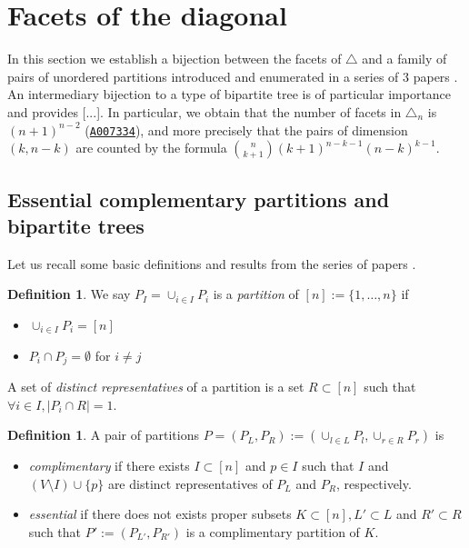 \documentclass[11pt]{amsart}
\theoremstyle{definition}
\newtheorem{definition}[thm]{Definition}
\theoremstyle{remark}
\numberwithin{equation}{section}
\newcommand{\0}{\color{blue}{\mathsf{0}}}
\newcommand{\OEIS}[1]{{\rm \href{http://oeis.org/#1}{\texttt{#1}}}}
\begin{document}
\section{Facets of the diagonal}

In this section we establish a bijection between the facets of $\triangle$ and a family of pairs of unordered partitions introduced and enumerated in a series of 3 papers \cite{chen1969computer,chen1971tables,kajitani1982number}. An intermediary bijection to a type of bipartite tree is of particular importance and provides [...].
In particular, we obtain that the number of facets in $\triangle_n$ is $(n+1)^{n-2}$ (\OEIS{A007334}), and more precisely that the pairs of dimension $(k,n-k)$ are counted by the formula $\binom{n}{k+1}(k+1)^{n-k-1}(n-k)^{k-1}$.

\subsection{Essential complementary partitions and bipartite trees}
Let us recall some basic definitions and results from the series of papers \cite{chen1969computer,chen1971tables,kajitani1982number}.

\begin{definition}
We say $P_I = \cup_{i\in I} P_i$ is a \emph{partition} of $[n]:=\{1,\ldots,n\}$ if
\begin{itemize}
    \item $ \cup_{i\in I} P_i = [n]$
    \item $P_i \cap P_j = \emptyset$ for $i \neq j$
\end{itemize}
A set of \emph{distinct representatives} of a partition is a set $R\subset [n]$ such that $\forall i \in I,|P_i \cap R| = 1$.
\end{definition}



\begin{definition}
A pair of partitions $P=(P_L,P_R):=(\cup_{l\in L} P_l , \cup_{r\in R} P_r)$ is
\begin{itemize}
    \item \emph{complimentary} if there exists $I\subset [n]$ and $p \in I$ such that $I$ and $(V\setminus I) \cup \{p\}$ are distinct representatives of $P_L$ and $P_R$, respectively.
    \item \emph{essential} if there does not exists proper subsets $K \subset [n], L'\subset L$ and $R'\subset R$ such that $P':=(P_{L'},P_{R'})$ is a complimentary partition of $K$.
\end{itemize}
\end{definition}
\end{document}
